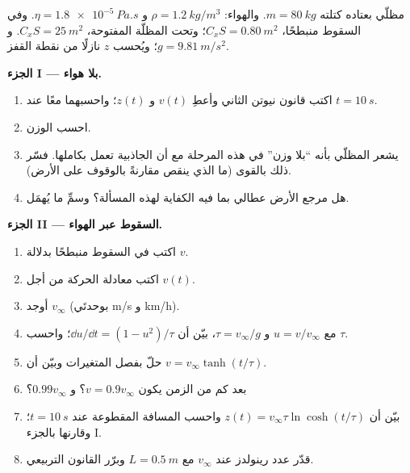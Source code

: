 \begin{problem}
\label{pb:b1:newton-dynamics:1}
مظلّي بعتاده كتلته $m = \qty{80}{kg}$. والهواء:
$\rho = \qty{1.2}{kg/m^3}$ و $\eta = \qty{1.8e-5}{Pa.s}$. وفي السقوط
منبطحًا، $C_xS = \qty{0.80}{m^2}$؛ وتحت المظلّة المفتوحة، $C_xS =
\qty{25}{m^2}$. و $g = \qty{9.81}{m/s^2}$؛ ويُحسب $z$ نازلًا من
نقطة القفز.

\medskip
\noindent\textbf{الجزء I --- بلا هواء.}
\begin{enumerate}
  \item اكتب قانون نيوتن الثاني وأعطِ $v(t)$ و $z(t)$؛ واحسبهما
        معًا عند $t = \qty{10}{s}$.
  \item احسب الوزن.
  \item يشعر المظلّي بأنه ``بلا وزن'' في هذه المرحلة مع أن
        الجاذبية تعمل بكاملها. فسّر ذلك بالقوى (ما الذي ينقص
        مقارنةً بالوقوف على الأرض).
  \item هل مرجع الأرض عطالي بما فيه الكفاية لهذه المسألة؟ وسمِّ ما
        يُهمَل.
\end{enumerate}

\medskip
\noindent\textbf{الجزء II --- السقوط عبر الهواء.}
\begin{enumerate}[resume]
  \item اكتب  في السقوط منبطحًا بدلالة $v$.
  \item اكتب معادلة الحركة من أجل $v(t)$.
  \item أوجد  $v_\infty$ (بوحدتَي \unit{m/s} و
        \unit{km/h}).
  \item مع $u = v/v_\infty$ و $\tau = v_\infty/g$، بيّن أن
        $\dd u/\dd t = (1 - u^2)/\tau$؛ واحسب $\tau$.
  \item حلّ بفصل المتغيرات وبيّن أن
        $v = v_\infty\tanh(t/\tau)$.
  \item بعد كم من الزمن يكون $v = 0.9v_\infty$؟ و $0.99v_\infty$؟
  \item بيّن أن $z(t) = v_\infty\tau\ln\cosh(t/\tau)$ واحسب
        المسافة المقطوعة عند $t = \qty{10}{s}$؛ وقارنها بالجزء I.
  \item قدّر عدد رينولدز عند $v_\infty$ مع $L = \qty{0.5}{m}$
        وبرّر القانون التربيعي.
\end{enumerate}


\end{problem}
